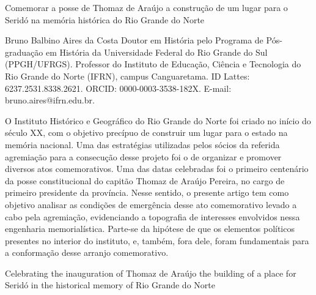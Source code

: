 \begin{refsection}
    \renewcommand{\thefigure}{\arabic{figure}}

    \chapterTwoLines
    {Comemorar a posse de Thomaz de Araújo}
    {a construção de um lugar para o Seridó na memória histórica do Rio Grande do Norte}
    \label{chap:comemorar}
    
    \articleAuthor
    {Bruno Balbino Aires da Costa}
    {Doutor em História pelo Programa de Pós-graduação em História da Universidade Federal do Rio Grande do Sul (PPGH/UFRGS). Professor do Instituto de Educação, Ciência e Tecnologia do Rio Grande do Norte (IFRN), campus Canguaretama. ID Lattes: 6237.2531.8338.2621. ORCID: 0000-0003-3538-182X. E-mail: bruno.aires@ifrn.edu.br.}

    \begin{galoResumo}
        O Instituto Histórico e Geográfico do Rio Grande do Norte foi criado no início do século XX, com o objetivo precípuo de construir um lugar para o estado na memória nacional. Uma das estratégias utilizadas pelos sócios da referida agremiação para a consecução desse projeto foi o de organizar e promover diversos atos comemorativos. Uma das datas celebradas foi o primeiro centenário da posse constitucional do capitão Thomaz de Araújo Pereira, no cargo de primeiro presidente da província. Nesse sentido, o presente artigo tem como objetivo analisar as condições de emergência desse ato comemorativo levado a cabo pela agremiação, evidenciando a topografia de interesses envolvidos nessa engenharia memorialística. Parte-se da hipótese de que os elementos políticos presentes no interior do instituto, e, também, fora dele, foram fundamentais para a conformação desse arranjo comemorativo.
    \end{galoResumo}
    
    
    \begin{otherlanguage}{english}
    
    \fakeChapterTwoLines
    {Celebrating the inauguration of Thomaz de Araújo}
    {the building of a place for Seridó in the historical memory of Rio Grande do Norte}


\end{otherlanguage}
\end{refsection}
